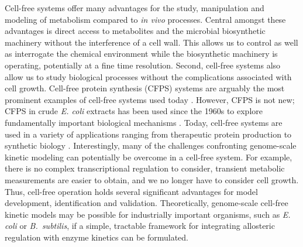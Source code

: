 \documentclass[12pt]{article}
\begin{document}
Cell-free systems offer many advantages for the study, manipulation and modeling of metabolism compared to \textit{in vivo} processes.
Central amongst these advantages is direct access to metabolites and the microbial biosynthetic machinery without the interference of a cell wall.
This allows us to control as well as interrogate the chemical environment while the biosynthetic machinery is operating, potentially at a fine time resolution.
Second, cell-free systems also allow us to study biological processes without the complications associated with cell growth.
Cell-free protein synthesis (CFPS) systems are arguably the most prominent examples of cell-free systems used today \citep{Jewett:2008aa}.
However, CFPS is not new; CFPS in crude \textit{E. coli} extracts has been used since the 1960s to explore fundamentally important biological mechanisms \citep{MATTHAEI:1961aa,NIRENBERG:1961aa}.
Today, cell-free systems are used in a variety of applications ranging from therapeutic protein production \citep{Lu:2014aa} to synthetic biology \citep{Hodgman:2012aa}.
Interestingly, many of the challenges confronting genome-scale kinetic modeling can potentially be overcome in a cell-free system.
For example, there is no complex transcriptional regulation to consider, transient metabolic measurements are easier to obtain, and we no longer have to consider cell growth.
Thus, cell-free operation holds several significant advantages for model development, identification and validation. Theoretically, genome-scale cell-free kinetic models may be possible for industrially important organisms,
such as \textit{E. coli} or \textit{B.~subtilis}, if a simple, tractable framework for integrating allosteric regulation with enzyme kinetics can be formulated.
\end{document}
